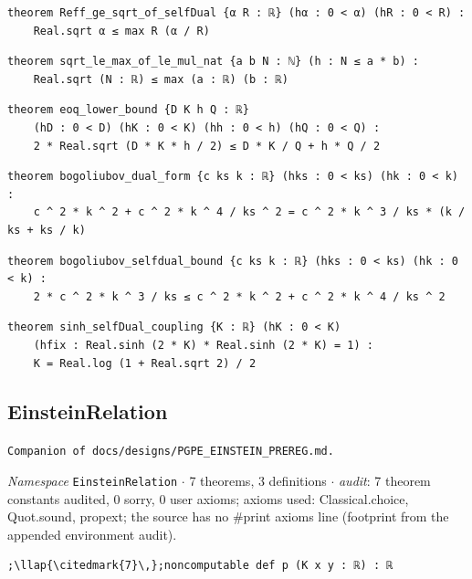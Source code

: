 \begin{lstlisting}[style=leancat]
theorem Reff_ge_sqrt_of_selfDual {α R : ℝ} (hα : 0 < α) (hR : 0 < R) :
    Real.sqrt α ≤ max R (α / R)
\end{lstlisting}

\begin{lstlisting}[style=leancat]
theorem sqrt_le_max_of_le_mul_nat {a b N : ℕ} (h : N ≤ a * b) :
    Real.sqrt (N : ℝ) ≤ max (a : ℝ) (b : ℝ)
\end{lstlisting}

\begin{lstlisting}[style=leancat]
theorem eoq_lower_bound {D K h Q : ℝ}
    (hD : 0 < D) (hK : 0 < K) (hh : 0 < h) (hQ : 0 < Q) :
    2 * Real.sqrt (D * K * h / 2) ≤ D * K / Q + h * Q / 2
\end{lstlisting}

\begin{lstlisting}[style=leancat]
theorem bogoliubov_dual_form {c ks k : ℝ} (hks : 0 < ks) (hk : 0 < k) :
    c ^ 2 * k ^ 2 + c ^ 2 * k ^ 4 / ks ^ 2 = c ^ 2 * k ^ 3 / ks * (k / ks + ks / k)
\end{lstlisting}

\begin{lstlisting}[style=leancat]
theorem bogoliubov_selfdual_bound {c ks k : ℝ} (hks : 0 < ks) (hk : 0 < k) :
    2 * c ^ 2 * k ^ 3 / ks ≤ c ^ 2 * k ^ 2 + c ^ 2 * k ^ 4 / ks ^ 2
\end{lstlisting}

\begin{lstlisting}[style=leancat]
theorem sinh_selfDual_coupling {K : ℝ} (hK : 0 < K)
    (hfix : Real.sinh (2 * K) * Real.sinh (2 * K) = 1) :
    K = Real.log (1 + Real.sqrt 2) / 2
\end{lstlisting}

\subsection{EinsteinRelation}\label{appA:EinsteinRelation}
{\footnotesize\raggedright\texttt{Companion of docs/\allowbreak{}designs/\allowbreak{}PGPE\_\allowbreak{}EINSTEIN\_\allowbreak{}PREREG.\allowbreak{}md.\allowbreak{}}\par}
{\footnotesize\raggedright\emph{Namespace} \texttt{EinsteinRelation} $\cdot$ 7 theorems, 3 definitions $\cdot$ \emph{audit}: 7 theorem constants audited, 0 sorry, 0 user axioms; axioms used: Classical.choice, Quot.sound, propext; the source has no \#print axioms line (footprint from the appended environment audit).\par}
\vspace{1pt}
\begin{lstlisting}[style=leancat]
;\llap{\citedmark{7}\,};noncomputable def p (K x y : ℝ) : ℝ
\end{lstlisting}

